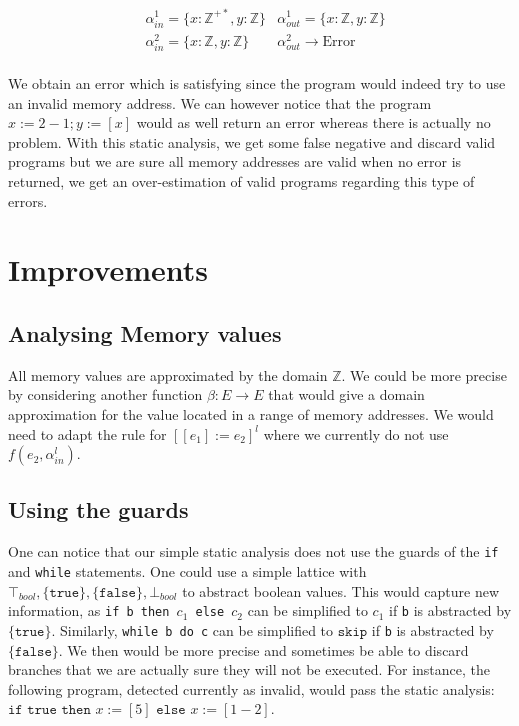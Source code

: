 \begin{align*}
	& \alpha_{in}^1 = \lbrace x: \mathbb{Z}^{+*}, y: \mathbb{Z} \rbrace & \alpha_{out}^1 = \lbrace x: \mathbb{Z}, y: \mathbb{Z} \rbrace \\
	& \alpha_{in}^2 = \lbrace x: \mathbb{Z}, y: \mathbb{Z} \rbrace & \alpha_{out}^2 \longrightarrow \text{Error} \\
\end{align*}

We obtain an error which is satisfying since the program would indeed try to use an invalid memory address.
We can however notice that the program $x:= 2 - 1; y:= [x]$ would as well return an error whereas there is actually no problem.
With this static analysis, we get some false negative and discard valid programs but we are sure all memory addresses are valid when no error is returned, \ie{} we get an over-estimation of valid programs regarding this type of errors.
 

\section*{Improvements}

\subsection*{Analysing Memory values}
All memory values are approximated by the domain $\mathbb{Z}$.
We could be more precise by considering another function $\beta: E \longrightarrow E$ that would give a domain approximation for the value located in a range of memory addresses.
We would need to adapt the rule for $\left[[e_1] := e_2\right]^l$ where we currently do not use $f(e_2, \alpha_{in}^l)$.


\subsection*{Using the guards}
One can notice that our simple static analysis does not use the guards of the \texttt{if} and \texttt{while} statements. One could use a simple lattice with $\top_{bool}, \lbrace \texttt{true} \rbrace, \lbrace \texttt{false} \rbrace, \bot_{bool}$ to abstract boolean values. This would capture new information, as \texttt{if b then $c_1$ else $c_2$} can be simplified to $c_1$ if \texttt{b} is abstracted by $\lbrace \texttt{true} \rbrace$.
Similarly, \texttt{while b do c} can be simplified to $\texttt{skip}$ if \texttt{b} is abstracted by $\lbrace \texttt{false} \rbrace$.
We then would be more precise and sometimes be able to discard branches that we are actually sure they will not be executed.
For instance, the following program, detected currently as invalid, would pass the static analysis: $\texttt{if true then~} x:= [5] \texttt{~else~} x:= [1 - 2]$.

